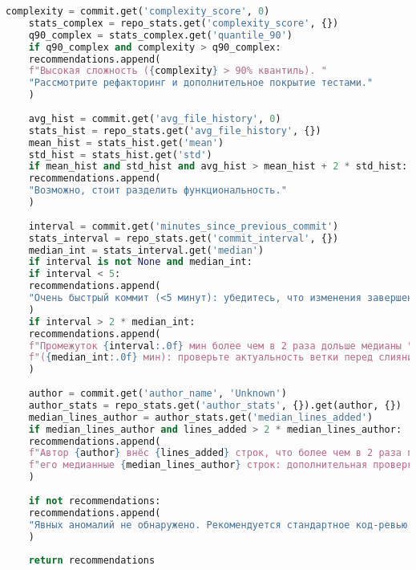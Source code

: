 \begin{lstlisting}[language=Python, caption={{ \texttt{recommendationds.py}}}]
	complexity = commit.get('complexity_score', 0)
	stats_complex = repo_stats.get('complexity_score', {})
	q90_complex = stats_complex.get('quantile_90')
	if q90_complex and complexity > q90_complex:
	recommendations.append(
	f"Высокая сложность ({complexity} > 90% квантиль). "
	"Рассмотрите рефакторинг и дополнительное покрытие тестами."
	)
	
	avg_hist = commit.get('avg_file_history', 0)
	stats_hist = repo_stats.get('avg_file_history', {})
	mean_hist = stats_hist.get('mean')
	std_hist = stats_hist.get('std')
	if mean_hist and std_hist and avg_hist > mean_hist + 2 * std_hist:
	recommendations.append(
	"Возможно, стоит разделить функциональность."
	)
	
	interval = commit.get('minutes_since_previous_commit')
	stats_interval = repo_stats.get('commit_interval', {})
	median_int = stats_interval.get('median')
	if interval is not None and median_int:
	if interval < 5:
	recommendations.append(
	"Очень быстрый коммит (<5 минут): убедитесь, что изменения завершены и протестированы."
	)
	if interval > 2 * median_int:
	recommendations.append(
	f"Промежуток {interval:.0f} мин более чем в 2 раза дольше медианы "
	f"({median_int:.0f} мин): проверьте актуальность ветки перед слиянием."
	)
	
	author = commit.get('author_name', 'Unknown')
	author_stats = repo_stats.get('author_stats', {}).get(author, {})
	median_lines_author = author_stats.get('median_lines_added')
	if median_lines_author and lines_added > 2 * median_lines_author:
	recommendations.append(
	f"Автор {author} внёс {lines_added} строк, что более чем в 2 раза превышает "
	f"его медианные {median_lines_author} строк: дополнительная проверка кода."
	)
	
	if not recommendations:
	recommendations.append(
	"Явных аномалий не обнаружено. Рекомендуется стандартное код-ревью и покрытие тестами."
	)
	
	return recommendations
\end{lstlisting}